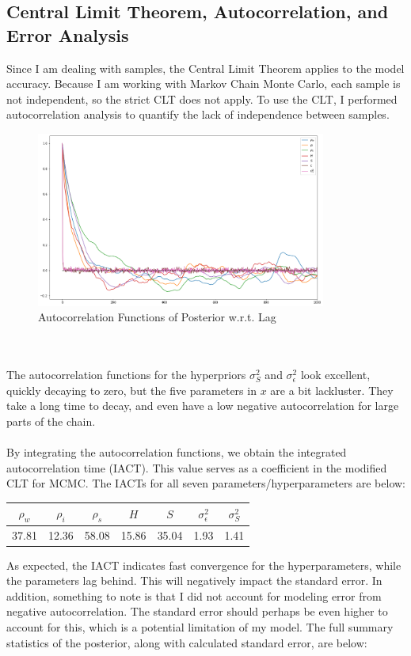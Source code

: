 \documentclass[12pt, letterpaper]{article}
\begin{document}
\subsection{Central Limit Theorem, Autocorrelation, and Error Analysis}
Since I am dealing with samples, the Central Limit Theorem applies to the model accuracy. Because I am working with Markov Chain Monte Carlo,
each sample is not independent, so the strict CLT does not apply. To use the CLT, I performed autocorrelation analysis to quantify
the lack of independence between samples.
\begin{figure}[h]
\centering
\caption{Autocorrelation Functions of Posterior w.r.t. Lag}
\includegraphics[width=0.85\textwidth]{autocorr.png}
\end{figure}
\\\\
The autocorrelation functions for the hyperpriors $\sigma^2_S$ and $\sigma^2_\epsilon$ look excellent, quickly decaying to zero,
but the five parameters in $x$ are a bit lackluster. They take a long time to decay, and even have a low negative autocorrelation
for large parts of the chain.
\\\\
By integrating the autocorrelation functions, we obtain the integrated autocorrelation time (IACT). This value serves as a coefficient
in the modified CLT for MCMC. The IACTs for all seven parameters/hyperparameters are below:
\medskip
\begin{center}
\begin{tabular} { |c|c|c|c|c|c|c| }

\hline
$\rho_w$ & $\rho_i $& $\rho_s$ & $H$ & $S$ & $\sigma^2_\epsilon$ & $\sigma^2_S$ \\
\hline
37.81    &  12.36   &  58.08   &15.86&35.04&     1.93            & 1.41         \\
\hline

\end{tabular}
\end{center}
\medskip
As expected, the IACT indicates fast convergence for the hyperparameters, while the parameters lag behind. This will negatively impact the
standard error. In addition, something to note is that I did not account for modeling error from negative autocorrelation. The standard
error should perhaps be even higher to account for this, which is a potential limitation of my model. The full summary statistics of the posterior,
along with calculated standard error, are below:
\end{document}
